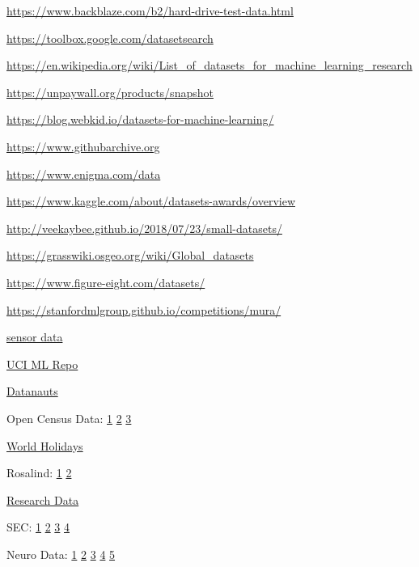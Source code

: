 \documentclass[]{book}
\begin{document}
\url{https://www.backblaze.com/b2/hard-drive-test-data.html}

\url{https://toolbox.google.com/datasetsearch}

\url{https://en.wikipedia.org/wiki/List_of_datasets_for_machine_learning_research}

\url{https://unpaywall.org/products/snapshot}

\url{https://blog.webkid.io/datasets-for-machine-learning/}

\url{https://www.githubarchive.org}

\url{https://www.enigma.com/data}

\url{https://www.kaggle.com/about/datasets-awards/overview}

\url{http://veekaybee.github.io/2018/07/23/small-datasets/}

\url{https://grasswiki.osgeo.org/wiki/Global_datasets}

\url{https://www.figure-eight.com/datasets/}

\url{https://stanfordmlgroup.github.io/competitions/mura/}

\href{https://data.melbourne.vic.gov.au/Transport-Movement/Pedestrian-volume-updated-monthly-/b2ak-trbp}{sensor
data}

\href{http://archive.ics.uci.edu/ml/}{UCI ML Repo}

\href{https://open.nasa.gov/explore/datanauts/}{Datanauts}

Open Census Data:
\href{https://www.producthunt.com/posts/open-census-data}{1} \textbar{}
\href{https://www.safegraph.com/open-census-data?ref=producthunt}{2}
\textbar{} \href{https://docs.safegraph.com/docs/open-census-data}{3}

\href{https://date.nager.at/}{World Holidays}

Rosalind: \href{http://rosalind.info/problems/locations/}{1} \textbar{}
\href{https://github.com/mtarbit/Rosalind-Problems}{2}

\href{http://academictorrents.com/}{Research Data}

SEC: \href{https://www.sec.gov/structureddata}{1} \textbar{}
\href{https://www.sec.gov/dera/data/financial-statement-and-notes-data-set.html}{2}
\textbar{}
\href{https://www.sec.gov/dera/data/financial-statement-data-sets.html}{3}
\textbar{}
\href{https://www.sec.gov/dera/data/financial-statement-data-sets.html}{4}

Neuro Data: \href{http://preprocessed-connectomes-project.org}{1}
\textbar{} \href{http://www.humanconnectomeproject.org}{2} \textbar{}
\href{http://fcon_1000.projects.nitrc.org/indi/abide/}{3} \textbar{}
\href{https://www.ncbi.nlm.nih.gov/pubmed/25840117}{4} \textbar{}
\href{https://coins.mrn.org}{5}
\end{document}
